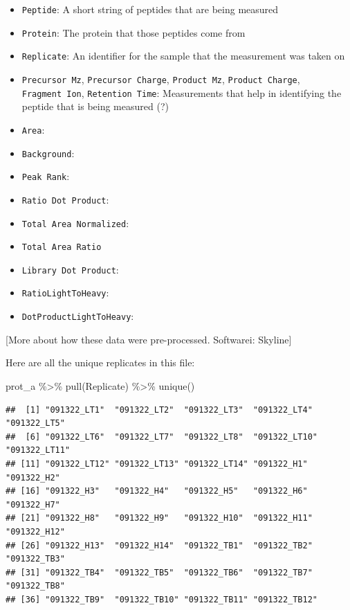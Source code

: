 \documentclass[
]{book}
\newenvironment{Shaded}{\begin{snugshade}}{\end{snugshade}}
\newcommand{\FunctionTok}[1]{\textcolor[rgb]{0.00,0.00,0.00}{#1}}
\newcommand{\NormalTok}[1]{#1}
\newcommand{\SpecialCharTok}[1]{\textcolor[rgb]{0.00,0.00,0.00}{#1}}
\providecommand{\tightlist}{%
  \setlength{\itemsep}{0pt}\setlength{\parskip}{0pt}}
\begin{document}
\begin{itemize}
\tightlist
\item
  \texttt{Peptide}: A short string of peptides that are being measured
\item
  \texttt{Protein}: The protein that those peptides come from
\item
  \texttt{Replicate}: An identifier for the sample that the measurement was taken on
\item
  \texttt{Precursor\ Mz}, \texttt{Precursor\ Charge}, \texttt{Product\ Mz}, \texttt{Product\ Charge},
  \texttt{Fragment\ Ion}, \texttt{Retention\ Time}: Measurements that help in identifying the peptide
  that is being measured (?)
\item
  \texttt{Area}:
\item
  \texttt{Background}:
\item
  \texttt{Peak\ Rank}:
\item
  \texttt{Ratio\ Dot\ Product}:
\item
  \texttt{Total\ Area\ Normalized}:
\item
  \texttt{Total\ Area\ Ratio}
\item
  \texttt{Library\ Dot\ Product}:
\item
  \texttt{RatioLightToHeavy}:
\item
  \texttt{DotProductLightToHeavy}:
\end{itemize}

{[}More about how these data were pre-processed. Softwarei: Skyline{]}

Here are all the unique replicates in this file:

\begin{Shaded}
\begin{Highlighting}[]
\NormalTok{prot\_a }\SpecialCharTok{\%\textgreater{}\%} 
  \FunctionTok{pull}\NormalTok{(Replicate) }\SpecialCharTok{\%\textgreater{}\%} 
  \FunctionTok{unique}\NormalTok{()}
\end{Highlighting}
\end{Shaded}

\begin{verbatim}
##  [1] "091322_LT1"  "091322_LT2"  "091322_LT3"  "091322_LT4"  "091322_LT5" 
##  [6] "091322_LT6"  "091322_LT7"  "091322_LT8"  "091322_LT10" "091322_LT11"
## [11] "091322_LT12" "091322_LT13" "091322_LT14" "091322_H1"   "091322_H2"  
## [16] "091322_H3"   "091322_H4"   "091322_H5"   "091322_H6"   "091322_H7"  
## [21] "091322_H8"   "091322_H9"   "091322_H10"  "091322_H11"  "091322_H12" 
## [26] "091322_H13"  "091322_H14"  "091322_TB1"  "091322_TB2"  "091322_TB3" 
## [31] "091322_TB4"  "091322_TB5"  "091322_TB6"  "091322_TB7"  "091322_TB8" 
## [36] "091322_TB9"  "091322_TB10" "091322_TB11" "091322_TB12"
\end{verbatim}
\end{document}
